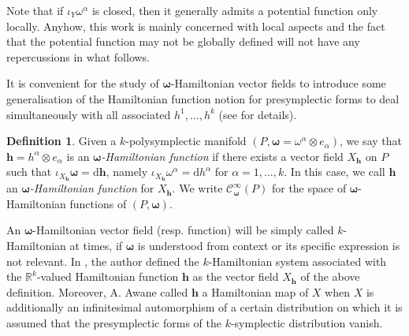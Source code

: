 \documentclass[11pt]{article}
\theoremstyle{plain}
\theoremstyle{definition}
\newtheorem{definition}[theorem]{Definition}
\newcommand{\R}{\mathbb{R}}
\newcommand{\Cinfty}{\mathscr{C}^\infty}
\newcommand{\bomega}{{\boldsymbol{\omega}}}
\newcommand{\bh}{{\boldsymbol{h}}}
\renewcommand{\d}{\mathrm{d}}
\newcommand*{\inn}[1]{\iota_{#1}}
\def\d{\mathrm{d}}
\numberwithin{equation}{section}
\begin{document}
Note that if $\iota_Y\omega^\alpha$ is closed, then it generally  admits a potential function only locally. Anyhow, this work is mainly concerned with local aspects and the fact that the potential function may not be globally defined will not have any repercussions in what follows. 

It is convenient for the study of $\bomega$-Hamiltonian vector fields to introduce some generalisation of the Hamiltonian function notion for presymplectic forms to deal simultaneously with all associated $h^1,\ldots,h^k$ (see \cite{Awa_92, LV_15} for details). 

\begin{definition}
    Given a $k$-polysymplectic manifold $(P,\bomega=\omega^\alpha\otimes e_\alpha)$, we say that $\bh = h^\alpha\otimes e_\alpha$ is an \textit{$\bomega$-Hamiltonian function} if there exists a vector field $X_\bh$ on $P$ such that  $\inn{X_\bh}\bomega=
    \d \bh$, namely $\inn{X_\bh}\omega^\alpha=\d h^\alpha$ for $\alpha = 1,\dotsc,k$. In this case, we call $\bh$ an \textit{$\boldsymbol{\omega}$-Hamiltonian function} for $X_\bh$. We write $\Cinfty_{\boldsymbol{\omega}}(P)$ for the space of $\boldsymbol{\omega}$-Hamiltonian functions of $(P,\bomega)$.
\end{definition}

An ${\bomega}$-Hamiltonian vector field (resp. function) will be simply called $k$-Hamiltonian at times, if $\bomega$ is understood from context or its specific expression is not relevant. 
In \cite{Mer_97}, the author defined the $k$-Hamiltonian system associated with the $\R^k$-valued Hamiltonian function $\bh$ as the vector field $X_\bh$ of the above definition. Moreover, A. Awane \cite{Awa_92} called $\bh$ a Hamiltonian map of $X$ when $X$ is additionally an infinitesimal automorphism of a certain distribution on which it is assumed that the presymplectic forms of the $k$-symplectic distribution vanish.
\end{document}
